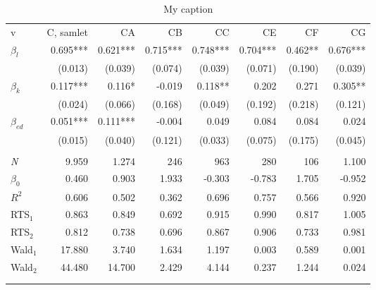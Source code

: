 \begin{table}[tb]
\centering
\caption{My caption}
\label{my-label}
\begin{tabular}{@{}lrrrrrrr@{}}\arrayrulecolor{MidnightBlue}\toprule
v             & C, samlet & CA       & CB       & CC       & CE       & CF      & CG       \\ \arrayrulecolor{MidnightBlue}\midrule
$\beta_l$      & 0.695***  & 0.621*** & 0.715*** & 0.748*** & 0.704*** & 0.462** & 0.676*** \\
              & (0.013)   & (0.039)  & (0.074)  & (0.039)  & (0.071)  & (0.190) & (0.039)  \\
$\beta_k$      & 0.117***  & 0.116*   & -0.019   & 0.118**  & 0.202    & 0.271   & 0.305**  \\
              & (0.024)   & (0.066)  & (0.168)  & (0.049)  & (0.192)  & (0.218) & (0.121)  \\
$\beta_{ed}$ & 0.051***  & 0.111*** & -0.004   & 0.049    & 0.084    & 0.084   & 0.024    \\
              & (0.015)   & (0.040)  & (0.121)  & (0.033)  & (0.075)  & (0.175) & (0.045)  \\
              &           &          &          &          &          &         &          \\
\emph{N}  & 9.959     & 1.274    & 246      & 963      & 280      & 106     & 1.100    \\
$\beta_0$         & 0.460     & 0.903    & 1.933    & -0.303   & -0.783   & 1.705   & -0.952   \\
$R^2$            & 0.606     & 0.502    & 0.362    & 0.696    & 0.757    & 0.566   & 0.920    \\
RTS$_1$          & 0.863     & 0.849    & 0.692    & 0.915    & 0.990    & 0.817   & 1.005    \\
RTS$_2$           & 0.812     & 0.738    & 0.696    & 0.867    & 0.906    & 0.733   & 0.981    \\
Wald$_1$         & 17.880    & 3.740    & 1.634    & 1.197    & 0.003    & 0.589   & 0.001    \\
Wald$_2$         & 44.480    & 14.700   & 2.429    & 4.144    & 0.237    & 1.244   & 0.024   \\ \arrayrulecolor{MidnightBlue}\midrule
\multicolumn{8}{l}{Standardfejl i parantes. Kilde: Danmarks Statistik og egne beregninger.} \\
\arrayrulecolor{MidnightBlue}\bottomrule
\end{tabular}
\end{table}